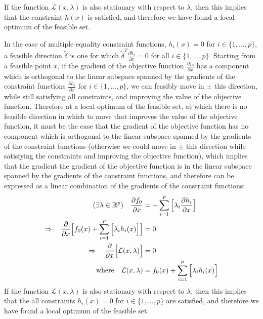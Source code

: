 If the function $\mathcal{L}(x, \lambda)$ is also stationary with respect to $\lambda$, then this implies that the constraint $h(x)$ is satisfied, and therefore we have found a local optimum of the feasible set.

In the case of multiple equality constraint functions, $h_i(x) = 0$ for $i \in \{1,\hdots,p\}$, a feasible direction $\tilde{\delta}$ is one for which $\tilde{\delta}^T\frac{\partial h_i}{\partial x}=0$ for all $i \in \{1,\hdots,p\}$. Starting from a feasible point $\tilde{x}$, if the gradient of the objective function $\frac{\partial f_0}{\partial x}$ has a component which is orthogonal to the linear subspace spanned by the gradients of the constraint functions $\frac{\partial h_i}{\partial x}$ for $i \in \{1,\hdots,p\}$, we can feasibly move in $\pm$ this direction, while still satisfying all constraints, and improving the value of the objective function. Therefore at a local optimum of the feasible set, at which there is no feasible direction in which to move that improves the value of the objective function, it must be the case that the gradient of the objective function has no component which is orthogonal to the linear subspace spanned by the gradients of the constraint functions (otherwise we could move in $\pm$ this direction while satisfying the constraints and improving the objective function), which implies that the gradient the gradient of the objective function is in the linear subspace spanned by the gradients of the constraint functions, and therefore can be expressed as a linear combination of the gradients of the constraint functions:
\begin{align*}
    (\exists \lambda\in\mathbb{R}^p)\quad\frac{\partial f_0}{\partial x} &= -\sum_{i=1}^{p}{\Bigl[\lambda_i \frac{\partial h_i}{\partial x}\Bigr]} \\
    \Rightarrow\quad\frac{\partial}{\partial x}\Bigl[f_0(x) + \sum_{i=1}^{p}{\Bigl[\lambda_i h_i(x)\Bigr]} \Bigr] &= 0 \\
    \Rightarrow\quad\frac{\partial}{\partial x}\Bigl[\mathcal{L}(x, \lambda) \Bigr] &= 0 \\
    \text{where} \quad \mathcal{L}(x, \lambda) &= f_0(x) + \sum_{i=1}^{p}{\Bigl[\lambda_i h_i(x)\Bigr]}
\end{align*}
If the function $\mathcal{L}(x, \lambda)$ is also stationary with respect to $\lambda$, then this implies that the all constraints $h_i(x)=0$ for $i \in \{1,\hdots,p\}$ are satisfied, and therefore we have found a local optimum of the feasible set.
